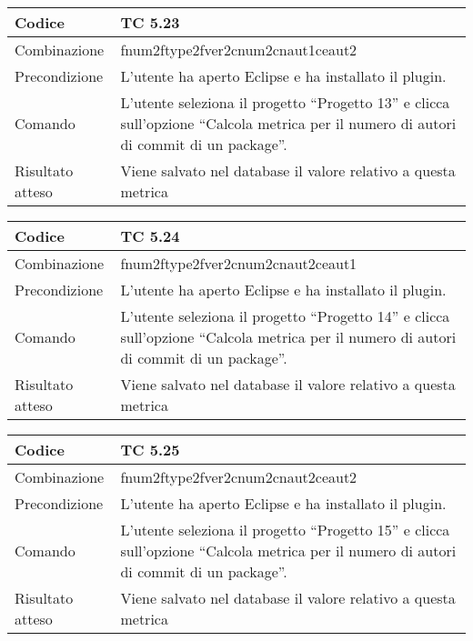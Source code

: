 \begin{table}[ht]
\begin{tabular}{|p{3cm}|p{9cm}|}
\hline
\cellcolor{lightgray}Codice				& TC 5.23								\\
\hline
\cellcolor{lightgray}Combinazione		& fnum2ftype2fver2cnum2cnaut1ceaut2									\\
\hline
\cellcolor{lightgray}Precondizione		& L'utente ha aperto Eclipse e ha installato il plugin.					\\
\hline
\cellcolor{lightgray}Comando			& L'utente seleziona il progetto ``Progetto 13''  e clicca sull'opzione ``Calcola metrica per il numero di autori di commit di un package''.	\\
\hline
\cellcolor{lightgray}Risultato atteso	& Viene salvato nel database il valore relativo a questa metrica	\\
\hline
\end{tabular}
\end{table}

\begin{table}[ht]
\begin{tabular}{|p{3cm}|p{9cm}|}
\hline
\cellcolor{lightgray}Codice				& TC 5.24								\\
\hline
\cellcolor{lightgray}Combinazione		& fnum2ftype2fver2cnum2cnaut2ceaut1								\\
\hline
\cellcolor{lightgray}Precondizione		& L'utente ha aperto Eclipse e ha installato il plugin.			\\
\hline
\cellcolor{lightgray}Comando			& L'utente seleziona il progetto ``Progetto 14''  e clicca sull'opzione ``Calcola metrica per il numero di autori di commit di un package''.	\\
\hline
\cellcolor{lightgray}Risultato atteso	& Viene salvato nel database il valore relativo a questa metrica	\\
\hline
\end{tabular}
\end{table}

\begin{table}[ht]
\begin{tabular}{|p{3cm}|p{9cm}|}
\hline
\cellcolor{lightgray}Codice				& TC 5.25								\\
\hline
\cellcolor{lightgray}Combinazione		& fnum2ftype2fver2cnum2cnaut2ceaut2 									\\
\hline
\cellcolor{lightgray}Precondizione		& L'utente ha aperto Eclipse e ha installato il plugin.			\\
\hline
\cellcolor{lightgray}Comando			& L'utente seleziona il progetto ``Progetto 15''  e clicca sull'opzione ``Calcola metrica per il numero di autori di commit di un package''.	\\
\hline
\cellcolor{lightgray}Risultato atteso	& Viene salvato nel database il valore relativo a questa metrica	\\
\hline
\end{tabular}
\end{table}

